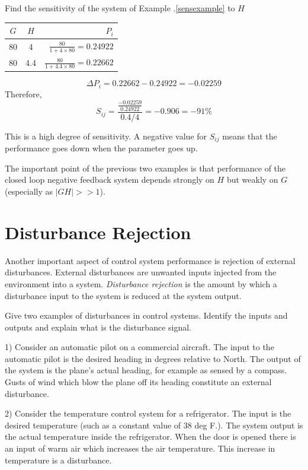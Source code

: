 \begin{ExampleSmall}
Find the sensitivity of the system of Example \thechapter.\ref{sensexample} to $H$


\vspace{0.2in}
\begin{tabular}{ccr} \hline
 $G$   & $H$  &  $P_i$       \\ \hline
  80   & 4    &  $\frac{80}{1+4\times80} =   0.24922$     \\ \hline
  80   & 4.4  &  $\frac{80}{1+4.4\times80} = 0.22662$                      \\ \hline
\end{tabular}
\vspace{0.2in}

\[
\Delta P_i = 0.22662 - 0.24922 =  -0.02259
\]
Therefore,
\[
S_{ij} = \frac{\frac{-0.02259}{0.24922}}{0.4/4} = -0.906 = -91\%
\]

This is a high degree of sensitivity.  A negative value for $S_{ij}$ means that the performance goes down when the parameter goes up.
\end{ExampleSmall}

 The important point of the previous two examples is that performance of the closed loop negative feedback system depends strongly on $H$ but weakly on $G$ (especially as $|GH| >>1$).


\section{Disturbance Rejection}

Another important aspect of control system performance is rejection of external disturbances.  External disturbances are unwanted inputs injected from the environment into a system.   {\it Disturbance rejection} is the amount by which a disturbance input to the system is reduced at the system output.

\begin{ExampleSmall}
Give two examples of disturbances in control systems.  Identify the inputs and outputs and explain what is the disturbance signal.

1) Consider an automatic pilot on a commercial aircraft.  The input to the automatic pilot is the desired heading in degrees relative to North. The output of the system is the plane's actual heading, for example as sensed by a compass.   Gusts of wind which blow the plane off its heading constitute an external disturbance.

2) Consider the temperature control system for a refrigerator.  The input is the desired temperature (such as a constant value of 38 deg F.). The system output is the actual temperature inside the refrigerator.   When the door is opened there is an input of warm air which increases the air temperature.  This increase in temperature is   a disturbance.
\end{ExampleSmall}


